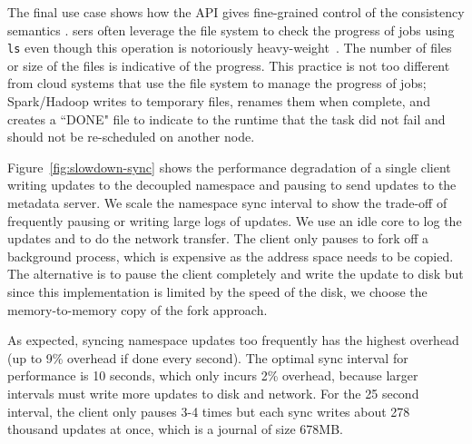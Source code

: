 The final use case shows how the API gives
 fine-grained control of the
consistency semantics . sers often
leverage the file system to check the progress of jobs using \texttt{ls} even
though this operation is notoriously heavy-weight~\cite{carns:ipdps09-pvfs,
eshel:fast10-panache}. The number of files or size of the files is indicative
of the progress. This practice is not too different from cloud systems that use the
file system to manage the progress of jobs; Spark/Hadoop writes to temporary
files, renames them when complete, and creates a ``DONE" file to indicate to
the runtime that the task did not fail and should not be re-scheduled on
another node.  


Figure~\ref{fig:slowdown-sync} shows the performance degradation of a single
client writing  updates to the decoupled namespace and
pausing to send updates to the metadata server.  We scale the namespace sync interval to
show the trade-off of frequently pausing or writing large logs of updates.  We
use an idle core to log the updates and to do the network transfer. The client
only pauses to fork off a background process, which is expensive as the address
space needs to be copied. The alternative is to pause the client completely and
write the update to disk but since this implementation is limited by the speed
of the disk, we choose the memory-to-memory copy of the fork approach.

As expected, syncing namespace updates too frequently has the highest overhead
(up to 9\% overhead if done every second). The optimal sync interval for
performance is 10 seconds, which only incurs 2\% overhead, because larger
intervals must write more updates to disk and network. For the 25 second
interval, the client only pauses 3-4 times but each sync writes about 278
thousand updates at once, which is a journal of size 678MB.

